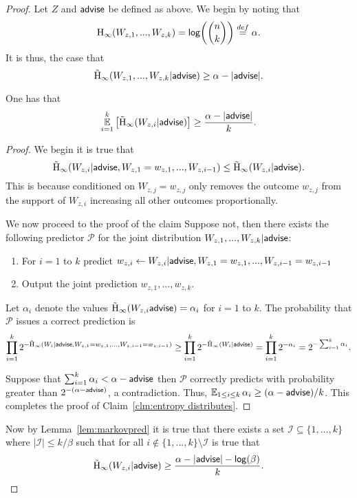 \begin{proof}
Let $Z$ and ${\mathsf{advise}}$ be defined as above. We begin by noting that \[
\mathrm{H}_\infty(W_{z, 1},..., W_{z, k}) = \mathsf{log}\!\left(n\choose k\right)\overset{def}=\alpha.\]
 It is thus, the case that 
\[
\tilde{\mathrm{H}}_\infty(W_{z, 1},..., W_{z, k} | {\mathsf{advise}}) \ge \alpha - |{\mathsf{advise}}|.
\]
\begin{claim}
One has that 
\begin{align*}
\operatorname*{\mathbb{E}}_{i=1}^k \left[\tilde{\mathrm{H}}_\infty(W_{z, i} | {\mathsf{advise}})\right] \ge \frac{\alpha - |{\mathsf{advise}}|}{k}.
\end{align*}
\label{clm:entropy distributes}
\end{claim}
\begin{proof}
We begin it is true that 
\[
\tilde{\mathrm{H}}_\infty(W_{z,i} | {\mathsf{advise}}, W_{z, 1}=w_{z,1},..., W_{z,i-1}) \le \tilde{\mathrm{H}}_\infty(W_{z,i} | {\mathsf{advise}}).
\]
This is because conditioned on $W_{z, j} =w_{z,j}$ only removes the outcome $w_{z,j}$ from the support of $W_{z,i}$ increasing all other outcomes proportionally.  

We now proceed to the proof of the claim
Suppose not, then there exists the following predictor $\mathcal{P}$ for the joint distribution $W_{z, 1},..., W_{z, k} | {\mathsf{advise}}$:
\begin{enumerate}
\item For $i=1$ to $k$ predict $w_{z,i}\leftarrow W_{z, i}| {\mathsf{advise}}, W_{z,1}=w_{z,1},..., W_{z,i-1}=w_{z,i-1}$
\item Output the joint prediction $w_{z,1},..., w_{z, k}$.  
\end{enumerate}
Let $\alpha_i$ denote the values $\tilde{\mathrm{H}}_\infty(W_{z,i}{\mathsf{advise}}) = \alpha_i$ for $i=1$ to $k$. 
The probability that $\mathcal{P}$ issues a correct prediction is
\begin{align*}
\prod_{i=1}^k 2^{-\tilde{\mathrm{H}}_\infty(W_i | {\mathsf{advise}},  W_{z,1}=w_{z,1},..., W_{z,i-1}=w_{z,i-1})} \ge \prod_{i=1}^k 2^{-\tilde{\mathrm{H}}_\infty(W_i | {\mathsf{advise}})} = \prod_{i=1}^k 2^{-\alpha_i}  = 2^{-\sum_{i=1}^k \alpha_i}.
\end{align*}

Suppose that $\sum_{i=1}^k \alpha_i < \alpha-{\mathsf{advise}}$ then $\mathcal{P}$ correctly predicts with probability greater than $2^{-(\alpha-{\mathsf{advise}})}$, a contradiction.  Thus, $\operatorname*{\mathbb{E}}_{1\le i\le k} \alpha_i \ge (\alpha-{\mathsf{advise}})/k$. 
This completes the proof of Claim~\ref{clm:entropy distributes}.
\end{proof}

Now by Lemma~\ref{lem:markovpred} it is true that there exists a set $\mathcal{I}\subseteq \{1,...,k\}$ where $| \mathcal{I} | \le k/\beta$ such that for all $i\not \in \{1,...,k\} \setminus\mathcal{I}$ is true that 
\[
\tilde{\mathrm{H}}_\infty(W_{z,i} | {\mathsf{advise}}) \ge \frac{\alpha -|{\mathsf{advise}}| - \mathsf{log}\!\left(\beta\right)}{k}.
\]


\end{proof}
